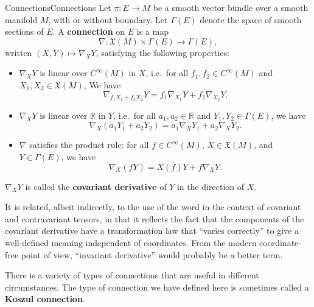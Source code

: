 \documentclass[../main.tex]{subfiles}
\begin{document}
\begin{definition}{Connections}{Connections}
	Let $\pi: E \to M$ be a smooth vector bundle over a smooth manifold $M$, with or without boundary. Let $\Gamma(E)$ denote the space of smooth sections of $E$. A \textbf{connection} on $E$ is a map
	\begin{equation}
		\nabla: \mathfrak{X}(M) \times \Gamma(E) \to \Gamma(E),
	\end{equation}
	written $(X, Y) \mapsto \nabla_X Y$, satisfying the following properties:
	\begin{itemize}
		\item $\nabla_X Y$ is linear over $C^{\infty}(M)$ in $X$, i.e.\ for all $f_1, f_2 \in C^{\infty}(M)$ and $X_1, X_2 \in \mathfrak{X}(M)$, We have
		      \begin{equation}
			      \nabla_{f_1 X_1 + f_2 X_2} Y = f_1 \nabla_{X_1} Y + f_2 \nabla_{X_2} Y.
		      \end{equation}
		\item $\nabla_X Y$ is linear over $\mathbb{R}$ in $Y$, i.e.\ for all $a_1, a_2 \in \mathbb{R}$ and $Y_1, Y_2 \in \Gamma(E)$, we have
		      \begin{equation}
			      \nabla_X (a_1 Y_1 + a_2 Y_2) = a_1 \nabla_X Y_1 + a_2 \nabla_X Y_2.
		      \end{equation}
		\item $\nabla$ satisfies the product rule: for all $f \in C^{\infty}(M)$, $X \in \mathfrak{X}(M)$, and $Y \in \Gamma(E)$, we have
		      \begin{equation}
			      \nabla_X (f Y) = X(f) Y + f \nabla_X Y.
		      \end{equation}
	\end{itemize}
\end{definition}

$\nabla_X Y$ is called the \textbf{covariant derivative} of $Y$ in the direction of $X$.

\begin{remark}
	It is related, albeit indirectly, to the use of the word in the context of covariant and contravariant tensors, in that it reflects the fact that the components of the covariant derivative have a transformation law that ``varies correctly'' to give a well-defined meaning independent of coordinates. From the modern coordinate-free point of view, ``invariant derivative'' would probably be a better term.
\end{remark}

There is a variety of types of connections that are useful in different circumstances. The type of connection we have defined here is sometimes called a \textbf{Koszul connection}.
\end{document}
